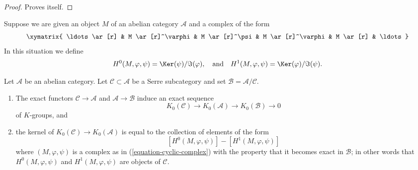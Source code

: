 \begin{proof}
Proves itself.
\end{proof}

\noindent
Suppose we are given an object $M$ of an abelian category $\mathcal{A}$
and a complex of the form
\begin{equation}
\label{equation-cyclic-complex}
\xymatrix{
\ldots \ar[r] &
M \ar[r]^\varphi &
M \ar[r]^\psi &
M \ar[r]^\varphi &
M \ar[r] & \ldots
}
\end{equation}
In this situation we define
$$
H^0(M, \varphi, \psi) = \Ker(\psi)/\Im(\varphi)
, \quad\text{and}\quad
H^1(M, \varphi, \psi) = \Ker(\varphi)/\Im(\psi).
$$

\begin{lemma}
\label{lemma-serre-subcategory-K-groups}
Let $\mathcal{A}$ be an abelian category.
Let $\mathcal{C} \subset \mathcal{A}$ be a Serre subcategory and
set $\mathcal{B} = \mathcal{A}/\mathcal{C}$.
\begin{enumerate}
\item The exact functors $\mathcal{C} \to \mathcal{A}$ and
$\mathcal{A} \to \mathcal{B}$ induce an exact sequence
$$
K_0(\mathcal{C}) \to
K_0(\mathcal{A}) \to
K_0(\mathcal{B}) \to
0
$$
of $K$-groups, and
\item the kernel of $K_0(\mathcal{C}) \to K_0(\mathcal{A})$ is equal
to the collection of elements of the form
$$
[H^0(M, \varphi, \psi)] - [H^1(M, \varphi, \psi)]
$$
where $(M, \varphi, \psi)$ is a complex as in (\ref{equation-cyclic-complex})
with the property that it becomes exact in $\mathcal{B}$; in other words
that $H^0(M, \varphi, \psi)$ and $H^1(M, \varphi, \psi)$ are
objects of $\mathcal{C}$.
\end{enumerate}
\end{lemma}

